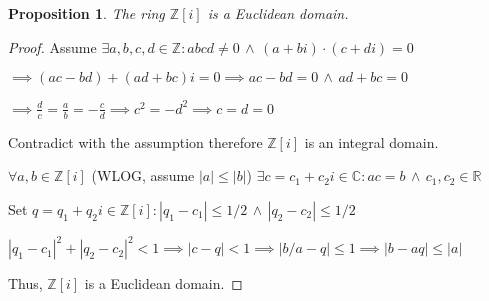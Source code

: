 \documentclass{article}
\newtheorem*{prop}{Proposition}
\theoremstyle{definition}\newtheorem{definition}{Definition}
\begin{document}
	\begin{prop}
		The ring $\mathbb Z[i]$ is a Euclidean domain.
	\end{prop}
			
	\begin{proof}
		Assume $\exists a,b,c,d \in \mathbb Z : abcd \neq 0\, \land \, (a+bi)\cdot (c+di)=0 $
		
		$\implies (ac-bd)+(ad+bc)i=0 \implies ac-bd=0 \, \land \, ad+bc=0 $
		
		$\implies \frac dc = \frac ab = -\frac cd \implies c^2=-d^2 \implies c=d=0 $
		
		Contradict with the assumption therefore $\mathbb Z[i]$ is an integral domain. 
		
		$\forall a,b \in \mathbb Z[i]$ (WLOG, assume $|a| \leq |b|$) $\exists c=c_1+c_2i \in  \mathbb C : ac=b \, \land \, c_1,c_2 \in \mathbb R$ 
		
		Set $q=q_1+q_2i \in \mathbb Z[i]: |q_1-c_1|\leq 1/2 \, \land \, |q_2-c_2|\leq 1/2$ 
		
		$
		|q_1-c_1|^2+|q_2-c_2|^2< 1 \implies |c-q|<1 \implies |{b}/{a}-q| \leq 1 \implies |b-aq|\leq |a|
		$
		 
		Thus, $\mathbb Z[i]$ is a Euclidean domain.
	\end{proof}
\end{document}
